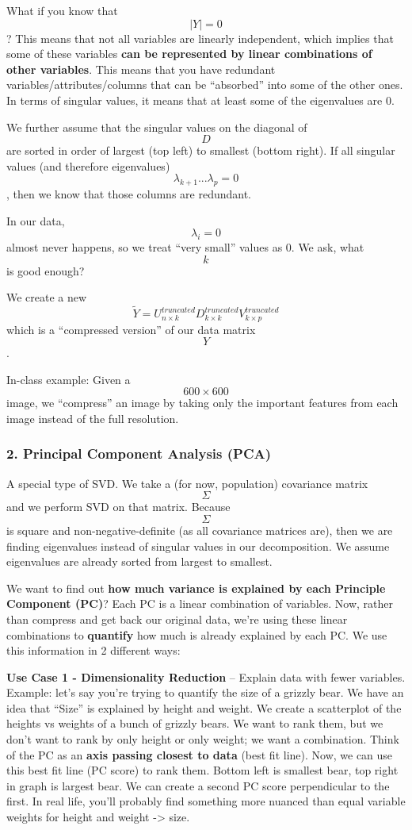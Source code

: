 \documentclass[]{article}
\begin{document}
What if you know that \[|Y| = 0\]? This means that not all variables are
linearly independent, which implies that some of these variables
\textbf{can be represented by linear combinations of other variables}.
This means that you have redundant variables/attributes/columns that can
be ``absorbed'' into some of the other ones. In terms of singular
values, it means that at least some of the eigenvalues are 0.

We further assume that the singular values on the diagonal of \[D\] are
sorted in order of largest (top left) to smallest (bottom right). If all
singular values (and therefore eigenvalues)
\[\lambda_{k + 1}...\lambda_p = 0\], then we know that those columns are
redundant.

In our data, \[\lambda_i = 0\] almost never happens, so we treat ``very
small'' values as 0. We ask, what \[k\] is good enough?

We create a new
\[\tilde{Y} = U_{n \times k}^{truncated} D_{k \times k}^{truncated} V_{k \times p}^{truncated}\]
which is a ``compressed version'' of our data matrix \[Y\].

In-class example: Given a \[600 \times 600\] image, we ``compress'' an
image by taking only the important features from each image instead of
the full resolution.

\hypertarget{principal-component-analysis-pca}{%
\subsubsection{2. Principal Component Analysis
(PCA)}\label{principal-component-analysis-pca}}

A special type of SVD. We take a (for now, population) covariance matrix
\[\Sigma\] and we perform SVD on that matrix. Because \[\Sigma\] is
square and non-negative-definite (as all covariance matrices are), then
we are finding eigenvalues instead of singular values in our
decomposition. We assume eigenvalues are already sorted from largest to
smallest.

We want to find out \textbf{how much variance is explained by each
Principle Component (PC)}? Each PC is a linear combination of variables.
Now, rather than compress and get back our original data, we're using
these linear combinations to \textbf{quantify} how much is already
explained by each PC. We use this information in 2 different ways:

\textbf{Use Case 1 - Dimensionality Reduction} -- Explain data with
fewer variables. Example: let's say you're trying to quantify the size
of a grizzly bear. We have an idea that ``Size'' is explained by height
and weight. We create a scatterplot of the heights vs weights of a bunch
of grizzly bears. We want to rank them, but we don't want to rank by
only height or only weight; we want a combination. Think of the PC as an
\textbf{axis passing closest to data} (best fit line). Now, we can use
this best fit line (PC score) to rank them. Bottom left is smallest
bear, top right in graph is largest bear. We can create a second PC
score perpendicular to the first. In real life, you'll probably find
something more nuanced than equal variable weights for height and weight
-\textgreater{} size.
\end{document}
